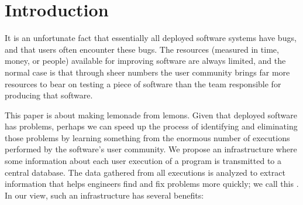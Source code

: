 \section{Introduction}
\label{sec:introduction}

It is an unfortunate fact that essentially all deployed software
systems have bugs, and that users often encounter these bugs.  The
resources (measured in time, money, or people) available for improving
software are always limited, and the normal case is that through
sheer numbers the user community brings far more resources to bear on
testing a piece of software than the team responsible for producing
that software.

This paper is about making lemonade from lemons.  Given that deployed
software has problems, perhaps we can speed up the process of
identifying and eliminating those problems by learning something from
the enormous number of executions performed by the software's user
community.  We propose an infrastructure where some information about
each user execution of a program is transmitted to a central database.
The data gathered from all executions is analyzed to extract
information that helps engineers find and fix problems more quickly;
we call this .  In our view, such an
infrastructure has several benefits:
